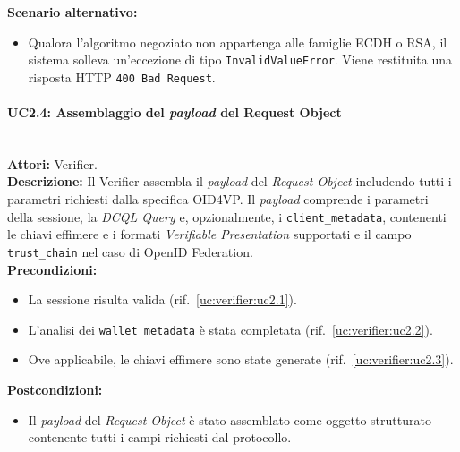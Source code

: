 \noindent\textbf{Scenario alternativo:}
\begin{itemize}
    \item Qualora l'algoritmo negoziato non appartenga alle famiglie ECDH o RSA, il sistema solleva un'eccezione di tipo \texttt{InvalidValueError}. Viene restituita una risposta HTTP \texttt{400 Bad Request}.
\end{itemize}

\paragraph{\large\bfseries UC2.4: Assemblaggio del \textit{payload} del Request Object}
\label{uc:verifier:uc2.4}
\mbox{}\\
\noindent\textbf{Attori:} Verifier.
\\
\noindent\textbf{Descrizione:} Il Verifier assembla il \textit{payload} del \textit{Request Object} includendo tutti i parametri richiesti dalla specifica OID4VP. Il \textit{payload} comprende i parametri della sessione, la \textit{DCQL Query} e, opzionalmente, i \texttt{client\_\allowbreak{}metadata}, contenenti le chiavi effimere e i formati \textit{Verifiable Presentation} supportati e il campo \texttt{trust\_\allowbreak{}chain} nel caso di OpenID Federation.
\\
\noindent\textbf{Precondizioni:}
\begin{itemize}
    \item La sessione risulta valida (rif.\ \ref{uc:verifier:uc2.1}).
    \item L'analisi dei \texttt{wallet\_\allowbreak{}metadata} è stata completata (rif.\ \ref{uc:verifier:uc2.2}).
    \item Ove applicabile, le chiavi effimere sono state generate (rif.\ \ref{uc:verifier:uc2.3}).
\end{itemize}
\noindent\textbf{Postcondizioni:}
\begin{itemize}
    \item Il \textit{payload} del \textit{Request Object} è stato assemblato come oggetto strutturato contenente tutti i campi richiesti dal protocollo.
\end{itemize}

